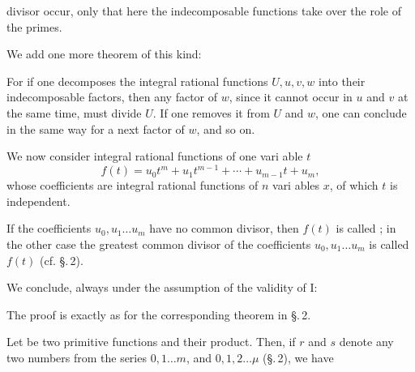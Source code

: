 
divisor occur, only that here the indecomposable functions
take over the role of the primes.

We add one more theorem of this kind:


For if one decomposes the integral rational functions $U, u, v, w$
into their indecomposable factors, then any factor of
$w$, since it cannot occur in $u$ and $v$ at the same time, must
divide $U$. If one removes it from $U$ and $w$, one can conclude
in the same way for a next factor of $w$, and so on.

We now consider integral rational functions of one vari\-
able $t$
\[
f(t) = u_0 t^m + u_1 t^{m-1} + \cdots + u_{m-1} t + u_m,
\]
whose coefficients are integral rational functions of $n$ vari\-
ables $x$, of which $t$ is independent.

If the coefficients $u_0, u_1 \ldots u_m$ have no common
divisor, then $f(t)$ is called ; in the other case the
greatest common divisor of the coefficients $u_0, u_1 \ldots u_m$
is called  $f(t)$ (cf. §.\,2).

We conclude, always under the assumption of the validity
of I:


The proof is exactly as for the corresponding theorem
in §.\,2.

Let
be two primitive functions and
their product. Then, if $r$ and $s$ denote any two numbers from
the series $0, 1 \ldots m$, and $0, 1, 2 \ldots \mu$ (§.\,2), we have
